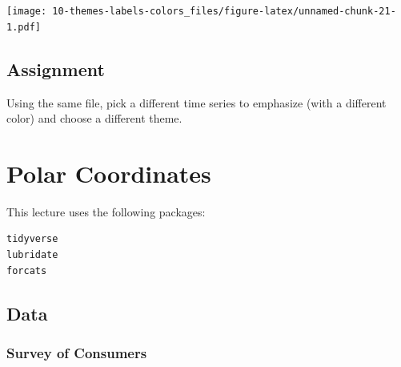 \documentclass[]{book}
\newenvironment{Shaded}{\begin{snugshade}}{\end{snugshade}}
\newcommand{\KeywordTok}[1]{\textcolor[rgb]{0.13,0.29,0.53}{\textbf{{#1}}}}
\newcommand{\DataTypeTok}[1]{\textcolor[rgb]{0.13,0.29,0.53}{{#1}}}
\newcommand{\DecValTok}[1]{\textcolor[rgb]{0.00,0.00,0.81}{{#1}}}
\newcommand{\FloatTok}[1]{\textcolor[rgb]{0.00,0.00,0.81}{{#1}}}
\newcommand{\StringTok}[1]{\textcolor[rgb]{0.31,0.60,0.02}{{#1}}}
\newcommand{\NormalTok}[1]{{#1}}
\theoremstyle{definition}
\theoremstyle{definition}
\theoremstyle{remark}
\begin{document}
\begin{Shaded}
\end{Shaded}

\texttt{[image: 10-themes-labels-colors\_files/figure-latex/unnamed-chunk-21-1.pdf]}

\section{Assignment}\label{assignment-9}

Using the same file, pick a different time series to emphasize (with a
different color) and choose a different theme.

\hypertarget{polar}{\chapter{Polar Coordinates}\label{polar}}

This lecture uses the following packages:

\begin{verbatim}
tidyverse
lubridate
forcats
\end{verbatim}

\section{Data}\label{data-8}

\subsection*{Survey of Consumers}\label{survey-of-consumers}
\end{document}
